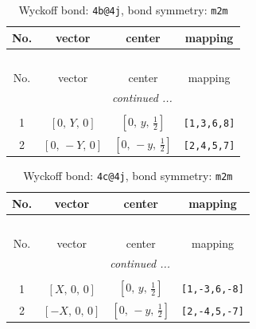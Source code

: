 \documentclass[fleqn,8pt]{jsarticle}
\begin{document}
\renewcommand{\arraystretch}{1.2}
\begin{longtable}{cccc}
\caption{Wyckoff bond: {\tt 4b@4j}, bond symmetry: {\tt m2m}}
 \\
 \hline \hline
No. & vector & center & mapping \\ \hline \endfirsthead

\multicolumn{3}{l}{\tablename\ \thetable{}} \\
 \hline \hline
No. & vector & center & mapping \\ \hline \endhead

 \hline \hline
\multicolumn{3}{r}{\footnotesize\it continued ...} \\ \endfoot

 \hline \hline
\multicolumn{3}{r}{} \\ \endlastfoot

1 & $\left[ 0,\, Y,\, 0 \right]$ & $\left[ 0,\, y,\, \frac{1}{2} \right]$ & {\tt [1,3,6,8]} \\ \hline
2 & $\left[ 0,\, - Y,\, 0 \right]$ & $\left[ 0,\, - y,\, \frac{1}{2} \right]$ & {\tt [2,4,5,7]} \\
\end{longtable}
\renewcommand{\arraystretch}{1.2}
\begin{longtable}{cccc}
\caption{Wyckoff bond: {\tt 4c@4j}, bond symmetry: {\tt m2m}}
 \\
 \hline \hline
No. & vector & center & mapping \\ \hline \endfirsthead

\multicolumn{3}{l}{\tablename\ \thetable{}} \\
 \hline \hline
No. & vector & center & mapping \\ \hline \endhead

 \hline \hline
\multicolumn{3}{r}{\footnotesize\it continued ...} \\ \endfoot

 \hline \hline
\multicolumn{3}{r}{} \\ \endlastfoot

1 & $\left[ X,\, 0,\, 0 \right]$ & $\left[ 0,\, y,\, \frac{1}{2} \right]$ & {\tt [1,-3,6,-8]} \\ \hline
2 & $\left[ - X,\, 0,\, 0 \right]$ & $\left[ 0,\, - y,\, \frac{1}{2} \right]$ & {\tt [2,-4,5,-7]} \\
\end{longtable}
\renewcommand{\arraystretch}{1.2}
\end{document}
